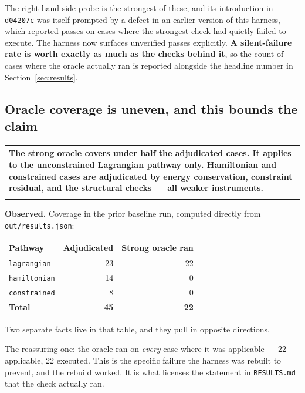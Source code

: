 \documentclass[11pt,a4paper]{article}
\makeatletter
\newenvironment{callout}
  {\par\medskip\noindent\begin{tabular}{@{}p{0.94\textwidth}@{}}
   \arrayrulecolor{warnrule}\hline\rule{0pt}{2.6ex}}
  {\\[0.8ex]\hline\arrayrulecolor{black}\end{tabular}\par\medskip}
\newcommand{\gitsha}[1]{\texttt{#1}}
\makeatother
\begin{document}
\noindent The right-hand-side probe is the strongest of these, and its
introduction in \gitsha{d04207c} was itself prompted by a defect in an earlier
version of this harness, which reported passes on cases where the strongest
check had quietly failed to execute. The harness now surfaces unverified passes
explicitly. \textbf{A silent-failure rate is worth exactly as much as the
checks behind it}, so the count of cases where the oracle actually ran is
reported alongside the headline number in Section~\ref{sec:results}.

\subsection{Oracle coverage is uneven, and this bounds the claim}
\label{sec:coverage}

\begin{callout}
\textbf{The strong oracle covers under half the adjudicated cases.} It applies
to the unconstrained Lagrangian pathway only. Hamiltonian and constrained cases
are adjudicated by energy conservation, constraint residual, and the structural
checks --- all weaker instruments.
\end{callout}

\noindent\textbf{Observed.} Coverage in the prior baseline run, computed
directly from \texttt{out/results.json}:

\begin{center}
\begin{tabular}{@{}lrr@{}}
\toprule
\textbf{Pathway} & \textbf{Adjudicated} & \textbf{Strong oracle ran} \\
\midrule
\texttt{lagrangian}  & 23 & 22 \\
\texttt{hamiltonian} & 14 & 0 \\
\texttt{constrained} & 8  & 0 \\
\midrule
\textbf{Total}       & \textbf{45} & \textbf{22} \\
\bottomrule
\end{tabular}
\end{center}

\noindent Two separate facts live in that table, and they pull in opposite
directions.

The reassuring one: the oracle ran on \emph{every} case where it was
applicable --- 22 applicable, 22 executed. This is the specific failure the
harness was rebuilt to prevent, and the rebuild worked. It is what licenses the
statement in \texttt{RESULTS.md} that the check actually ran.
\end{document}
